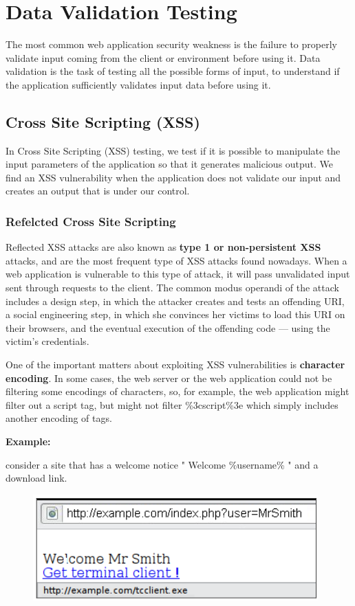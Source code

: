 \chapter{Data Validation Testing}

	The most common web application security weakness is the failure to properly validate input coming 
	from the client or environment before using it.  Data validation is the task of testing all the 
	possible forms of input, to understand if the application sufficiently validates input data before 
	using it.

\section{Cross Site Scripting (XSS)}

	In Cross Site Scripting (XSS) testing, we test if it is possible to manipulate the input parameters 
	of the application so that it generates malicious output. We find an XSS vulnerability when the
	application does not validate our input and creates an output that is under our control. 

	\subsection{Refelcted Cross Site Scripting}
		Reflected XSS attacks are also known as {\bf type 1 or non-persistent XSS} attacks, and are 
		the most frequent type of XSS attacks found nowadays.
		When a web application is vulnerable to this type of attack, it will pass unvalidated input 
		sent through requests to the client. The common modus operandi of the attack includes a design 
		step, in which the attacker creates and tests an offending URI, a social engineering step, 
		in which she convinces her victims to load this URI on their browsers, and the eventual execution 
		of the offending code — using the victim's credentials.

		One of the important matters about exploiting XSS vulnerabilities is {\bf character encoding}. 
		In some cases, the web server or the web application could not be filtering some encodings of
		characters, so, for example, the web application might filter out a script tag, but might not 
		filter \%3cscript\%3e which simply includes another encoding of tags. 

		{\bf Example:}

		consider a site that has a welcome notice " Welcome \%username\% " and a download link.


		\begin{figure}[H]
			\includegraphics[scale=0.5]{pics/xxs1.png}
		\end{figure}


